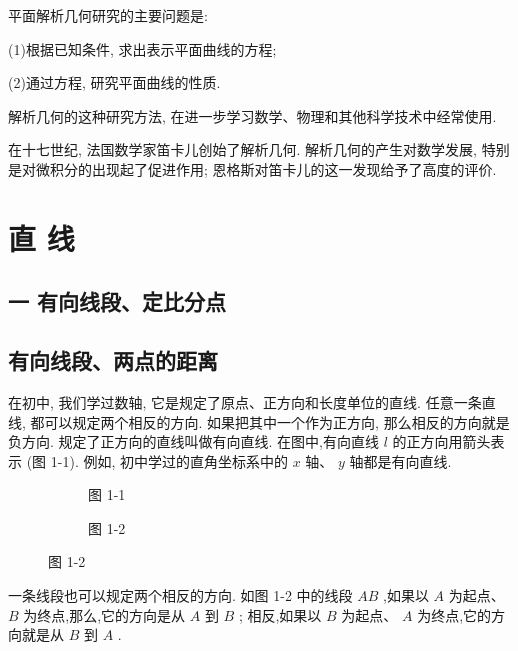 \documentclass[lang=cn,newtx,10.5pt,scheme=chinese]{elegantbook}
\begin{document}
平面解析几何研究的主要问题是:

(1)根据已知条件, 求出表示平面曲线的方程;

(2)通过方程, 研究平面曲线的性质.

解析几何的这种研究方法, 在进一步学习数学、物理和其他科学技术中经常使用.

在十七世纪, 法国数学家笛卡儿创始了解析几何. 解析几何的产生对数学发展, 特别是对微积分的出现起了促进作用; 恩格斯对笛卡儿的这一发现给予了高度的评价.

\chapter{直 线}

\section*{一 \text{ }有向线段、定比分点}

\section{有向线段、两点的距离}

在初中, 我们学过数轴, 它是规定了原点、正方向和长度单位的直线. 任意一条直线, 都可以规定两个相反的方向. 如果把其中一个作为正方向, 那么相反的方向就是负方向. 规定了正方向的直线叫做有向直线. 在图中,有向直线 \(l\) 的正方向用箭头表示 (图 1-1). 例如, 初中学过的直角坐标系中的 \(x\) 轴、 \(y\) 轴都是有向直线.

\begin{figure}[h]
  \centering
  \begin{subfigure}[h]{0.45\textwidth}
  	\centering
  	
  	\caption{图 1-1}
  \end{subfigure}
		\hfill %
  \begin{subfigure}[h]{0.45\textwidth}
  \centering
  
  \caption{图 1-2}
  \end{subfigure}
\end{figure}

一条线段也可以规定两个相反的方向. 如图 1-2 中的线段 \({AB}\) ,如果以 \(A\) 为起点、 \(B\) 为终点,那么,它的方向是从 \(A\) 到 \(B\) ; 相反,如果以 \(B\) 为起点、 \(A\) 为终点,它的方向就是从 \(B\) 到 \(A\) . 
\end{document}
